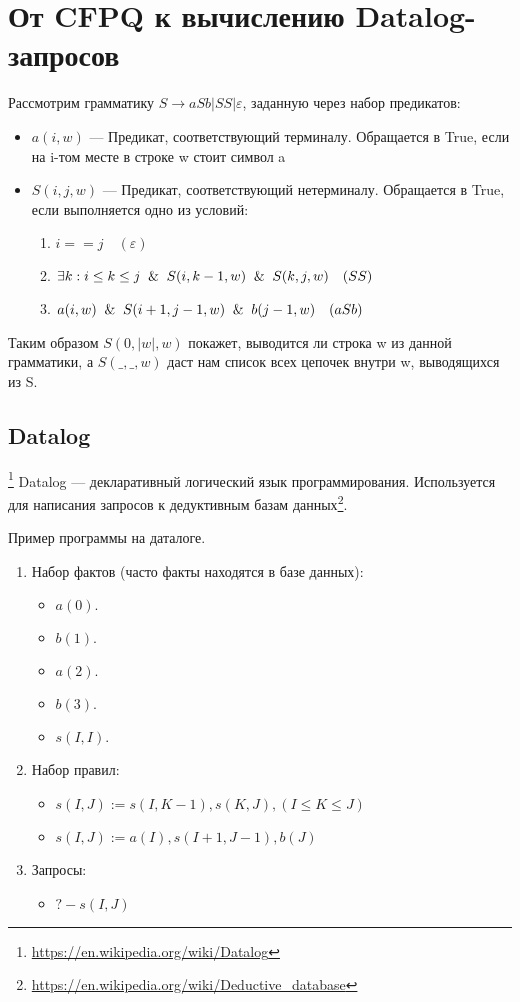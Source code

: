 \chapter{От CFPQ к вычислению Datalog-запросов}\label{Subsection Datalog}
Рассмотрим грамматику  $S \rightarrow aSb | SS | \varepsilon$, заданную через набор предикатов:
\begin{itemize}
	\item $a(i, w)$ --- Предикат, соответствующий терминалу. Обращается в True, если на i-том месте в строке w стоит символ a
	\item $S(i, j, w)$ --- Предикат, соответствующий нетерминалу. Обращается в True, если выполняется одно из условий:
	\begin{enumerate}
		\item $i == j \quad(\varepsilon)$
		\item $\exists k: i \leq k \leq j \And S(i, k - 1, w) \And S(k, j, w)  \quad (SS)$
		\item  ${a(i, w) \And S(i+1, j-1, w) \And b(j-1, w)} \quad (aSb)$
	\end{enumerate}
\end{itemize}

Таким образом $S(0,|w|,w)$ покажет, выводится ли строка w из данной грамматики,
а $S(\_,\_,w)$ даст нам список всех цепочек внутри w, выводящихся из S.

\section{Datalog}\footnote{\url{https://en.wikipedia.org/wiki/Datalog}}
Datalog --- декларативный логический язык программирования. Используется для написания запросов к дедуктивным базам данных\footnote{\url{https://en.wikipedia.org/wiki/Deductive_database}}. \\

\begin{example}
	Пример программы на даталоге.
	\begin{enumerate}
		\item Набор фактов (часто факты находятся в базе данных):
		\begin{itemize}
			\item $a(0).$
			\item $b(1).$
			\item $a(2).$
			\item $b(3).$
			\item $s(I, I).$
		\end{itemize}
		\item Набор правил:
		\begin{itemize}
			\item $s(I, J) := s(I, K-1), s(K,J), (I \leq K \leq J)$
			\item $s(I,J):=a(I), s(I+1, J-1),b(J)$
		\end{itemize}
		\item Запросы:
		\begin{itemize}
			\item $?- s(I, J)$
		\end{itemize}
	\end{enumerate}
\end{example}

